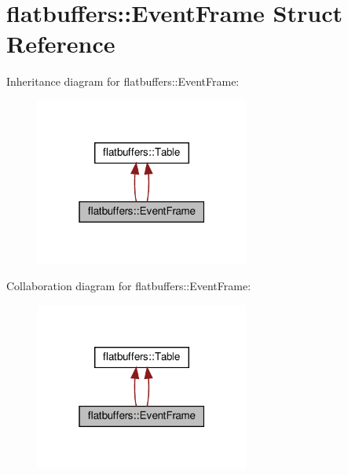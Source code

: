 \hypertarget{structflatbuffers_1_1EventFrame}{}\section{flatbuffers\+:\+:Event\+Frame Struct Reference}
\label{structflatbuffers_1_1EventFrame}


Inheritance diagram for flatbuffers\+:\+:Event\+Frame\+:
\nopagebreak
\begin{figure}[H]
\begin{center}
\leavevmode
\includegraphics[width=199pt]{structflatbuffers_1_1EventFrame__inherit__graph}
\end{center}
\end{figure}


Collaboration diagram for flatbuffers\+:\+:Event\+Frame\+:
\nopagebreak
\begin{figure}[H]
\begin{center}
\leavevmode
\includegraphics[width=199pt]{structflatbuffers_1_1EventFrame__coll__graph}
\end{center}
\end{figure}
